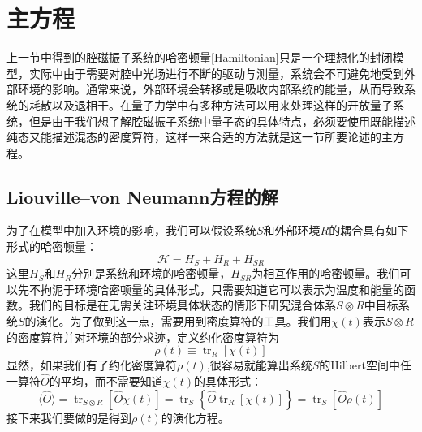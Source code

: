 \section{主方程}
\label{secMaster}
上一节中得到的腔磁振子系统的哈密顿量\eqref{Hamiltonian}只是一个理想化的封闭模型，实际中由于需要对腔中光场进行不断的驱动与测量，系统会不可避免地受到外部环境的影响。通常来说，外部环境会转移或是吸收内部系统的能量，从而导致系统的耗散以及退相干。在量子力学中有多种方法可以用来处理这样的开放量子系统，但是由于我们想了解腔磁振子系统中量子态的具体特点，必须要使用既能描述纯态又能描述混态的密度算符，这样一来合适的方法就是这一节所要论述的主方程。

\subsection{Liouville--von Neumann方程的解}
为了在模型中加入环境的影响，我们可以假设系统$S$和外部环境$R$的耦合具有如下形式的哈密顿量：
\begin{equation}
\mathcal{H}=H_{S}+H_{R}+H_{S R}
\label{Hsr}
\end{equation}
这里$H_{S}$和$H_{R}$分别是系统和环境的哈密顿量，$H_{SR}$为相互作用的哈密顿量。我们可以先不拘泥于环境哈密顿量的具体形式，只需要知道它可以表示为温度和能量的函数。我们的目标是在无需关注环境具体状态的情形下研究混合体系$S \otimes R$中目标系统$S$的演化。为了做到这一点，需要用到密度算符的工具。我们用$\chi(t)$表示$S \otimes R$的密度算符并对环境的部分求迹，定义约化密度算符为
\begin{equation}
\rho(t) \equiv \operatorname{tr}_{R}[\chi(t)]
\end{equation}
显然，如果我们有了约化密度算符$\rho(t)$,很容易就能算出系统$S$的Hilbert空间中任一算符$\hat{O}$的平均，而不需要知道$\chi(t)$的具体形式：
\begin{equation}
\langle\hat{O}\rangle=\operatorname{tr}_{S \otimes R}[\hat{O} \chi(t)]=\operatorname{tr}_{S}\left\{\hat{O} \operatorname{tr}_{R}[\chi(t)]\right\}=\operatorname{tr}_{S}[\hat{O} \rho(t)]
\end{equation}
接下来我们要做的是得到$\rho(t)$的演化方程。

